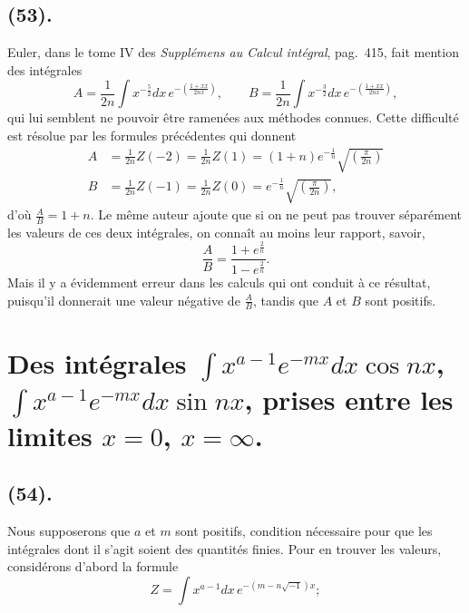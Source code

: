 \documentclass{article}
\begin{document}
\subsection*{(53).}

Euler, dans le tome IV des \emph{Supplémens au Calcul intégral}, pag.\ 415, fait mention des intégrales
\[ A=\frac{1}{2n}\int x^{-\frac{5}{2}}dx\,e^{-\left(\frac{1+xx}{2nx}\right)},\qquad B=\frac{1}{2n}\int x^{-\frac{3}{2}}dx\,e^{-\left(\frac{1+xx}{2nx}\right)}, \]
qui lui semblent ne pouvoir être ramenées aux méthodes connues. Cette difficulté est résolue par les formules précédentes qui donnent
\[ \begin{aligned} A&=\frac{1}{2n}Z(-2)=\frac{1}{2n}Z(1)=(1+n)e^{-\frac{1}{n}}\sqrt{\left(\frac{\pi}{2n}\right)}\\ B&=\frac{1}{2n}Z(-1)=\frac{1}{2n}Z(0)=e^{-\frac{1}{n}}\sqrt{\left(\frac{\pi}{2n}\right)}, \end{aligned} \]
d'où $\frac{A}{B}=1+n$. Le même auteur ajoute que si on ne peut pas trouver séparément les valeurs de ces deux intégrales, on connaît au moins leur rapport, savoir,
\[ \frac{A}{B}=\frac{1+e^{\frac{2}{n}}}{1-e^{\frac{2}{n}}}. \]
Mais il y a évidemment erreur dans les calculs qui ont conduit à ce résultat, puisqu'il donnerait une valeur négative de $\frac{A}{B}$, tandis que $A$ et $B$ sont positifs.

\section*{Des intégrales $\displaystyle\int x^{a-1}e^{-mx}dx\cos nx$, $\displaystyle\int x^{a-1}e^{-mx}dx\sin nx$, prises entre les limites $x=0$, $x=\infty$.}

\subsection*{(54).}

Nous supposerons que $a$ et $m$ sont positifs, condition nécessaire pour que les intégrales dont il s'agit soient des quantités finies. Pour en trouver les valeurs, considérons d'abord la formule
\[ Z=\int x^{a-1}dx\,e^{-(m-n\sqrt{-1})x}; \]
\end{document}
